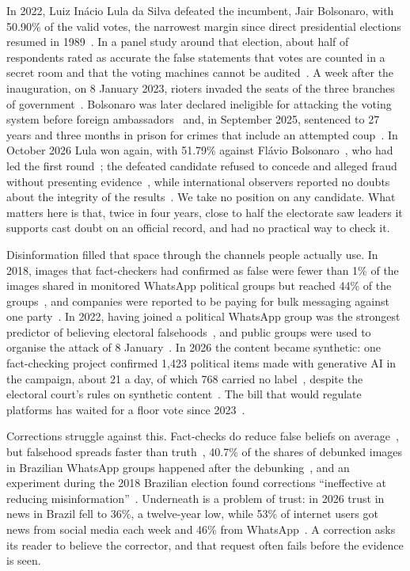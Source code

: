 In 2022, Luiz In\'acio Lula da Silva defeated the incumbent, Jair Bolsonaro, with 50.90\% of the valid votes, the narrowest margin since direct presidential elections resumed in 1989~\citep{tse2022result,g12022margin}. In a panel study around that election, about half of respondents rated as accurate the false statements that votes are counted in a secret room and that the voting machines cannot be audited~\citep{montalverne2024nexus}. A week after the inauguration, on 8 January 2023, rioters invaded the seats of the three branches of government~\citep{stf8jan}. Bolsonaro was later declared ineligible for attacking the voting system before foreign ambassadors~\citep{tse2023ineligible} and, in September 2025, sentenced to 27 years and three months in prison for crimes that include an attempted coup~\citep{stf2025conviction}. In October 2026 Lula won again, with 51.79\% against Fl\'avio Bolsonaro~\citep{tse2026runoff}, who had led the first round~\citep{g12026rounds}; the defeated candidate refused to concede and alleged fraud without presenting evidence~\citep{reuters2026concede,cnn2026letter}, while international observers reported no doubts about the integrity of the results~\citep{oas2026brazil}. We take no position on any candidate. What matters here is that, twice in four years, close to half the electorate saw leaders it supports cast doubt on an official record, and had no practical way to check it.

Disinformation filled that space through the channels people actually use. In 2018, images that fact-checkers had confirmed as false were fewer than 1\% of the images shared in monitored WhatsApp political groups but reached 44\% of the groups~\citep{resende2019whatsapp}, and companies were reported to be paying for bulk messaging against one party~\citep{camposmello2018empresarios}. In 2022, having joined a political WhatsApp group was the strongest predictor of believing electoral falsehoods~\citep{rossini2023electoral}, and public groups were used to organise the attack of 8 January~\citep{ozawa2024capitol}. In 2026 the content became synthetic: one fact-checking project confirmed 1,423 political items made with generative AI in the campaign, about 21 a day, of which 768 carried no label~\citep{lupa2026vigia}, despite the electoral court's rules on synthetic content~\citep{tse2024res23732,tse2026res23755}. The bill that would regulate platforms has waited for a floor vote since 2023~\citep{brasil2020pl2630}.

Corrections struggle against this. Fact-checks do reduce false beliefs on average~\citep{walter2020factchecking,porter2021global}, but falsehood spreads faster than truth~\citep{vosoughi2018spread}, 40.7\% of the shares of debunked images in Brazilian WhatsApp groups happened after the debunking~\citep{reis2020debunked}, and an experiment during the 2018 Brazilian election found corrections ``ineffective at reducing misinformation''~\citep{batistapereira2022fake}. Underneath is a problem of trust: in 2026 trust in news in Brazil fell to 36\%, a twelve-year low, while 53\% of internet users got news from social media each week and 46\% from WhatsApp~\citep{carro2026brazil}. A correction asks its reader to believe the corrector, and that request often fails before the evidence is seen.

